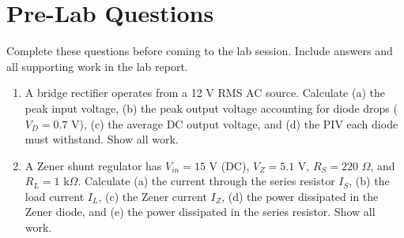 \documentclass[10pt]{article}
\begin{document}
\section{Pre-Lab Questions}
\label{sec:prelab}

Complete these questions before coming to the lab session.  Include answers and all supporting work in the lab report.\\

\begin{enumerate}

    
    \item A bridge rectifier operates from a 12 V RMS AC source. Calculate (a) the peak input voltage, (b) the peak output voltage accounting for diode drops ($V_D = 0.7$ V), (c) the average DC output voltage, and (d) the PIV each diode must withstand. Show all work.
    
    
    \item A Zener shunt regulator has $V_{in} = 15$ V (DC), $V_Z = 5.1$ V, $R_S = 220$ $\Omega$, and $R_L = 1$ k$\Omega$. Calculate (a) the current through the series resistor $I_S$, (b) the load current $I_L$, (c) the Zener current $I_Z$, (d) the power dissipated in the Zener diode, and (e) the power dissipated in the series resistor. Show all work. 
    

\end{enumerate}
\end{document}
